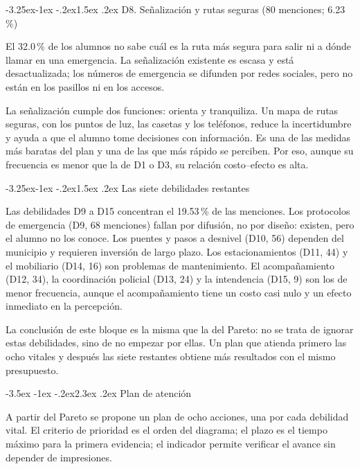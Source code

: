 \documentclass[11pt,a4paper]{article}
\makeatletter
\renewcommand\section{\@startsection{section}{1}{\z@}%
  {-3.5ex \@plus -1ex \@minus -.2ex}{2.3ex \@plus .2ex}%
  {\normalfont\Large\bfseries\color{uazblue}}}
\renewcommand\subsection{\@startsection{subsection}{2}{\z@}%
  {-3.25ex\@plus -1ex \@minus -.2ex}{1.5ex \@plus .2ex}%
  {\normalfont\large\bfseries\color{uazblue!85!black}}}
\makeatother
\begin{document}
\subsection{D8. Señalización y rutas seguras (80 menciones; 6.23\,\%)}

El 32.0\,\% de los alumnos no sabe cuál es la ruta más segura para salir ni a
dónde llamar en una emergencia. La señalización existente es escasa y está
desactualizada; los números de emergencia se difunden por redes sociales, pero
no están en los pasillos ni en los accesos.

La señalización cumple dos funciones: orienta y tranquiliza. Un mapa de rutas
seguras, con los puntos de luz, las casetas y los teléfonos, reduce la
incertidumbre y ayuda a que el alumno tome decisiones con información. Es una de
las medidas más baratas del plan y una de las que más rápido se perciben. Por
eso, aunque su frecuencia es menor que la de D1 o D3, su relación costo--efecto
es alta.

\subsection{Las siete debilidades restantes}

Las debilidades D9 a D15 concentran el 19.53\,\% de las menciones. Los
protocolos de emergencia (D9, 68 menciones) fallan por difusión, no por diseño:
existen, pero el alumno no los conoce. Los puentes y pasos a desnivel (D10, 56)
dependen del municipio y requieren inversión de largo plazo. Los estacionamientos
(D11, 44) y el mobiliario (D14, 16) son problemas de mantenimiento. El
acompañamiento (D12, 34), la coordinación policial (D13, 24) y la intendencia
(D15, 9) son los de menor frecuencia, aunque el acompañamiento tiene un costo
casi nulo y un efecto inmediato en la percepción.

La conclusión de este bloque es la misma que la del Pareto: no se trata de
ignorar estas debilidades, sino de no empezar por ellas. Un plan que atienda
primero las ocho vitales y después las siete restantes obtiene más resultados
con el mismo presupuesto.

\section{Plan de atención}

A partir del Pareto se propone un plan de ocho acciones, una por cada debilidad
vital. El criterio de prioridad es el orden del diagrama; el plazo es el tiempo
máximo para la primera evidencia; el indicador permite verificar el avance sin
depender de impresiones.
\end{document}

